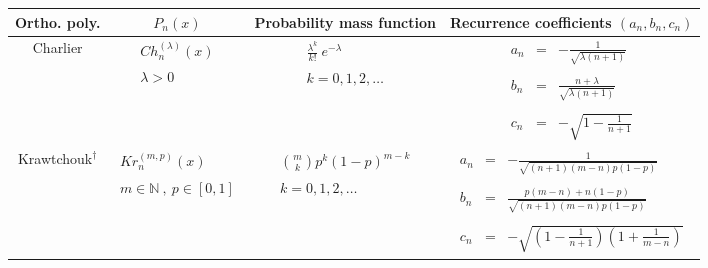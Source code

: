 {\begin{center}
    \begin{tabular}{|c|c|c|c|}
      \hline
      Ortho. poly. &  $P_n(x)$ &  Probability mass function                                   &  Recurrence coefficients $(a_n,b_n,c_n)$   \\
      \hline\hline
      Charlier  &  $\begin{array}{c} Ch^{(\lambda)}_n(x) \\ \\ \lambda>0 \\ \end{array}$            &  $\begin{array}{c} \displaystyle{\frac{\lambda^k}{k!}~e^{-\lambda}} \\ \\ k=0,1,2,\dots \\ \end{array}$  &   $\begin{array}{ccc} a_n & = & - \frac{1}{\sqrt{\lambda (n+1)}} \\   \\  b_n & = & \frac{n+\lambda}{\sqrt{\lambda (n+1)}} \\ \\ c_n & = &  - \sqrt{1 - \frac{1}{n+1}} \end{array} $ \\
      \hline
      Krawtchouk$^{\dagger}$ & $\begin{array}{c} Kr^{(m,p)}_n(x) \\ \\ m \in \mathbb{N}~,~p \in [0,1] \\ \end{array}$ & $\begin{array}{c} \displaystyle{\binom{m}{k}p^k (1-p)^{m-k}} \\ \\ k=0,1,2,\dots \\ \end{array}$ & $\begin{array}{ccc} a_n & = & - \frac{1}{\sqrt{(n+1)(m-n)p(1-p)}} \\   \\  b_n & = & \frac{p(m-n)+n(1-p)}{\sqrt{(n+1)(m-n)p(1-p)}} \\ \\ c_n & = &  - \sqrt{(1 - \frac{1}{n+1})(1+\frac{1}{m-n})} \end{array} $ \\
      \hline

    \end{tabular}


\end{center}}
